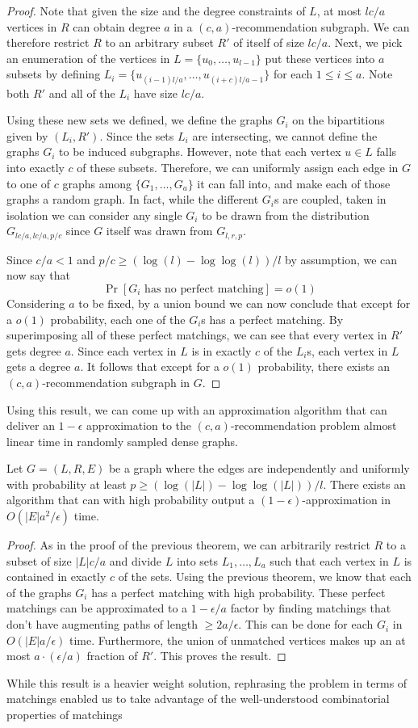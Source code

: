 \begin{proof}
Note that given the size and the degree constraints of $L$, at most $lc/a$ vertices in $R$ can obtain degree $a$ in a $(c,a)$-recommendation subgraph. We can therefore restrict $R$ to an arbitrary subset $R'$ of itself of size $lc/a$. Next, we pick an enumeration of the vertices in $L=\{u_0,\ldots, u_{l-1}\}$ put these vertices into $a$ subsets by defining $L_i = \{u_{(i-1)l/a}, \ldots, u_{(i+c)l/a-1}\}$ for each $1\leq i\leq a$. Note both $R'$ and all of the $L_i$ have size $lc/a$. \vs

Using these new sets we defined, we define the graphs $G_i$ on the bipartitions given by $(L_i, R')$. Since the sets $L_i$ are intersecting, we cannot define the graphs $G_i$ to be induced subgraphs. However, note that each vertex $u\in L$ falls into exactly $c$ of these subsets. Therefore, we can uniformly assign each edge in $G$ to one of $c$ graphs among $\{G_1,\ldots, G_a\}$ it can fall into, and make each of those graphs a random graph. In fact, while the different $G_i$s are coupled, taken in isolation we can consider any single $G_i$ to be drawn from the distribution $G_{lc/a,lc/a,p/c}$ since $G$ itself was drawn from $G_{l,r,p}$.

Since $c/a < 1$ and $p/c \geq (\log(l)-\log\log(l))/l$ by assumption, we can now say that 
\[ \Pr[\text{$G_i$ has no perfect matching}] = o(1) \]
Considering $a$ to be fixed, by a union bound we can now conclude that except for a $o(1)$ probability, each one of the $G_i$s has a perfect matching. By superimposing all of these perfect matchings, we can see that every vertex in $R'$ gets degree $a$. Since each vertex in $L$ is in exactly $c$ of the $L_i$s, each vertex in $L$ gets a degree $a$. It follows that except for a $o(1)$ probability, there exists an $(c,a)$-recommendation subgraph in $G$.
\end{proof}

Using this result, we can come up with an approximation algorithm that can deliver an $1-\epsilon$ approximation to the $(c,a)$-recommendation problem almost linear time in randomly sampled dense graphs.

\begin{thm}
Let $G=(L,R,E)$ be a graph where the edges are independently and uniformly with probability at least $p \geq (\log(|L|)-\log\log(|L|))/l$.   There exists an algorithm that can with high probability output a $(1-\epsilon)$-approximation in $O(|E|a^2/\epsilon)$ time.
\end{thm}
\begin{proof}
As in the proof of the previous theorem, we can arbitrarily restrict $R$ to a subset of size $|L|c/a$ and divide $L$ into sets $L_1,\ldots,L_a$ such that each vertex in $L$ is contained in exactly $c$ of the sets. Using the previous theorem, we know that each of the graphs $G_i$ has a perfect matching with high probability. These perfect matchings can be approximated to a $1-\epsilon/a$ factor by finding matchings that don't have augmenting paths of length $\geq 2a/\epsilon$. This can be done for each $G_i$ in $O(|E|a/\epsilon)$ time. Furthermore, the union of unmatched vertices makes up an at most $a\cdot(\epsilon/a)$ fraction of $R'$. This proves the result. 
\end{proof}

While this result is a heavier weight solution, rephrasing the problem in terms of matchings enabled us to take advantage of the well-understood combinatorial properties of matchings